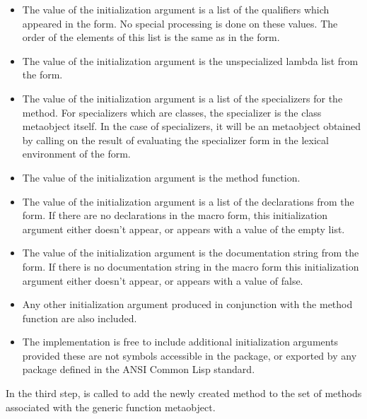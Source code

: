   \begin{itemize}
  \item 
    The value of the  initialization argument is a list of the
    qualifiers which appeared in the  form. No special processing is
    done on these values. The order of the elements of this list is the same as
    in the  form. 

  \item 
    The value of the  initialization argument is the unspecialized
    lambda list from the  form. 
  \item 
    The value of the  initialization argument is a list of the
    specializers for the method. For specializers which are classes, the
    specializer is the class metaobject itself. In the case of  specializers,
    it will be an  metaobject obtained by calling
     on the result of evaluating the  specializer form
    in the lexical environment of the  form. 
  \item 
    The value of the  initialization argument is the method function. 
  \item 
    The value of the  initialization argument is a list of the
    declarations from the  form. If there are no declarations in the
    macro form, this initialization argument either doesn't appear, or appears
    with a value of the empty list. 
  \item 
    The value of the  initialization argument is the documentation
    string from the  form. If there is no documentation string in the
    macro form this initialization argument either doesn't appear, or appears
    with a value of false. 
  \item 
    Any other initialization argument produced in conjunction with the method
    function are also included. 
  \item 
    The implementation is free to include additional initialization arguments
    provided these are not symbols accessible in the 
    package, 
    or exported by any package defined in the ANSI Common Lisp standard. 
  \end{itemize}

In the third step,  is called to add the newly created method to the
set of methods associated with the generic function metaobject. 

